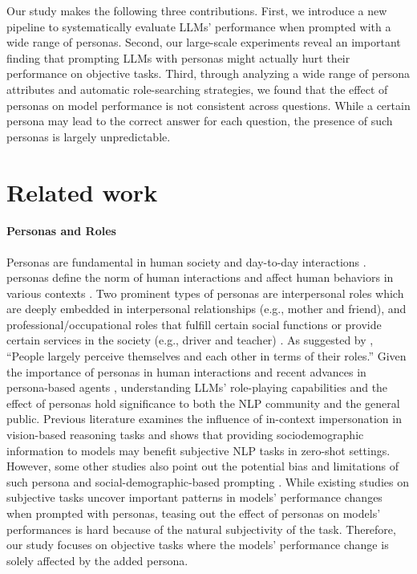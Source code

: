 \documentclass[11pt]{article}
\begin{document}
Our study makes the following three contributions. First, we introduce a new pipeline to systematically evaluate LLMs' performance when prompted with a wide range of personas. Second, our large-scale experiments reveal an important finding that prompting LLMs with personas might actually hurt their performance on objective tasks. Third,  through analyzing a wide range of persona attributes and automatic role-searching strategies, we found that the effect of personas on model performance is not consistent across questions. While a certain persona may lead to the correct answer for each question, the presence of such personas is largely unpredictable.


\section{Related work}

\paragraph{Personas and Roles}
Personas are fundamental in human society and day-to-day interactions \citep{heiss2017social, goffman2016presentation}.  personas define the norm of human interactions and affect human behaviors in various contexts \citep{sunstein1996social}. Two prominent types of personas are interpersonal roles which are deeply embedded in interpersonal relationships \citep{berscheid1994interpersonal} (e.g., mother and friend), and professional/occupational roles that fulfill certain social functions or provide certain services in the society (e.g., driver and teacher) \citep{bucher1961professions, brante1988sociological}.
%
As suggested by \citet{wolfensberger2000brief}, ``People largely perceive themselves and each other in terms of their roles.'' Given the importance of personas in human interactions and recent advances in persona-based agents \citep{wang2023rolellm, pataranutaporn2021ai, gupta2023bias}, understanding LLMs' role-playing capabilities and the effect of personas hold significance to both the NLP community and the general public. Previous literature examines the influence of in-context impersonation in vision-based reasoning tasks \cite{salewski2024context} and shows that providing sociodemographic information to models may benefit subjective NLP tasks in zero-shot settings. However, some other studies also point out the potential bias and limitations of such persona and social-demographic-based prompting \citep{sun2023aligning, hu2024quantifying, beck2024sensitivity}. 
While existing studies on subjective tasks uncover important patterns in models' performance changes when prompted with personas, teasing out the effect of personas on models' performances is hard because of the natural subjectivity of the task. Therefore, our study focuses on objective tasks where the models' performance change is solely affected by the added persona.
\end{document}

